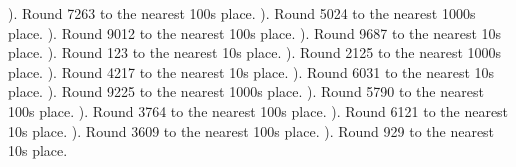 \documentclass{article}%
\begin{document}
). Round 7263 to the nearest 100s place.%
\newline%
\newline%
). Round 5024 to the nearest 1000s place.%
\newline%
\newline%
). Round 9012 to the nearest 100s place.%
\newline%
\newline%
). Round 9687 to the nearest 10s place.%
\newline%
\newline%
). Round 123 to the nearest 10s place.%
\newline%
\newline%
). Round 2125 to the nearest 1000s place.%
\newline%
\newline%
). Round 4217 to the nearest 10s place.%
\newline%
\newline%
). Round 6031 to the nearest 10s place.%
\newline%
\newline%
). Round 9225 to the nearest 1000s place.%
\newline%
\newline%
). Round 5790 to the nearest 100s place.%
\newline%
\newline%
). Round 3764 to the nearest 100s place.%
\newline%
\newline%
). Round 6121 to the nearest 10s place.%
\newline%
\newline%
). Round 3609 to the nearest 100s place.%
\newline%
\newline%
). Round 929 to the nearest 10s place.%
\end{document}
